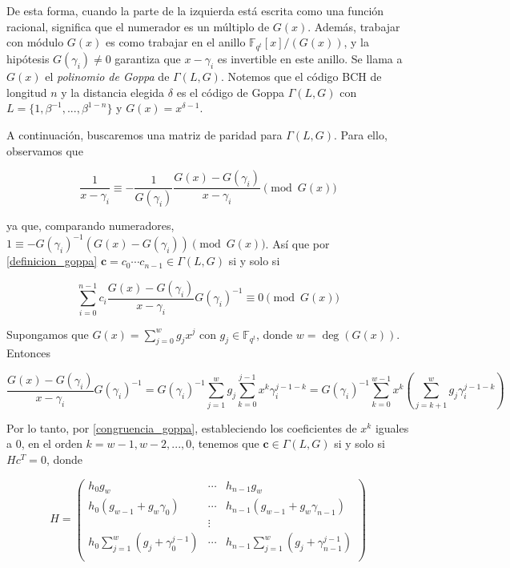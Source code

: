 De esta forma, cuando la parte de la izquierda está escrita como una función racional, significa que el numerador es un múltiplo de $G(x)$. Además, trabajar con módulo $G(x)$ es como trabajar en el anillo $\mathbb{F}_{q^t}[x]/(G(x))$, y la hipótesis $G(\gamma_i) \neq 0$ garantiza que $x - \gamma_i$ es invertible en este anillo. Se llama a $G(x)$ el \emph{polinomio de Goppa} de $\Gamma (L,G)$. Notemos que el código BCH de longitud $n$ y la distancia elegida $\delta$ es el código de Goppa $\Gamma (L,G)$ con $L = \{ 1, \beta^{-1}, ..., \beta^{1-n} \}$ y $G(x) = x^{\delta - 1}$.

A continuación, buscaremos una matriz de paridad para $\Gamma (L,G)$. Para ello, observamos que

$$\frac{1}{x - \gamma_i} \equiv - \frac{1}{G(\gamma_i)} \frac{G(x) - G(\gamma_i)}{x - \gamma_i} \pmod{ G(x)}$$

ya que, comparando numeradores, $1 \equiv - G(\gamma_i)^{-1} \left( G(x) - G(\gamma_i) \right) \pmod{G(x)}$. Así que por \eqref{definicion_goppa} $\textbf{c} = c_0 \cdots c_{n-1} \in \Gamma (L,G)$ si y solo si

\begin{equation}
    \label{congruencia_goppa}
    \sum_{i=0}^{n-1} c_i \frac{G(x) - G(\gamma_i)}{x - \gamma_i} G(\gamma_i)^{-1} \equiv 0 \pmod{G(x)}
\end{equation}

Supongamos que $G(x) = \sum_{j=0}^w g_j x^j$ con $g_j \in \mathbb{F}_{q^t}$, donde $w = \deg{(G(x))}$. Entonces

$$\frac{G(x) - G(\gamma_i)}{x - \gamma_i} G(\gamma_i)^{-1} = G(\gamma_i)^{-1} \sum_{j=1}^w g_j \sum_{k=0}^{j-1} x^k \gamma_i^{j-1-k} = G(\gamma_i)^{-1} \sum_{k=0}^{w-1} x^k \left( \sum_{j=k+1}^w g_j \gamma_i^{j-1-k} \right)$$

Por lo tanto, por \eqref{congruencia_goppa}, estableciendo los coeficientes de $x^k$ iguales a $0$, en el orden $k = w - 1, w - 2, ..., 0$, tenemos que $\textbf{c} \in \Gamma (L,G)$ si y solo si $Hc^T = 0$, donde 

\begin{equation}
    H = \left(
        \begin{array}{ccc} 
            h_0 g_w & \cdots & h_{n-1} g_w  \\
            h_0 (g_{w-1} + g_w \gamma_0) & \cdots & h_{n-1} (g_{w-1} + g_w \gamma_{n-1}) \\
            & \vdots & \\
            h_0 \sum_{j=1}^w \left( g_j + \gamma_0^{j-1} \right) & \cdots & h_{n-1} \sum_{j=1}^w \left( g_{j} + \gamma_{n-1}^{j-1} \right) \\
        \end{array}
        \right)
\end{equation}

